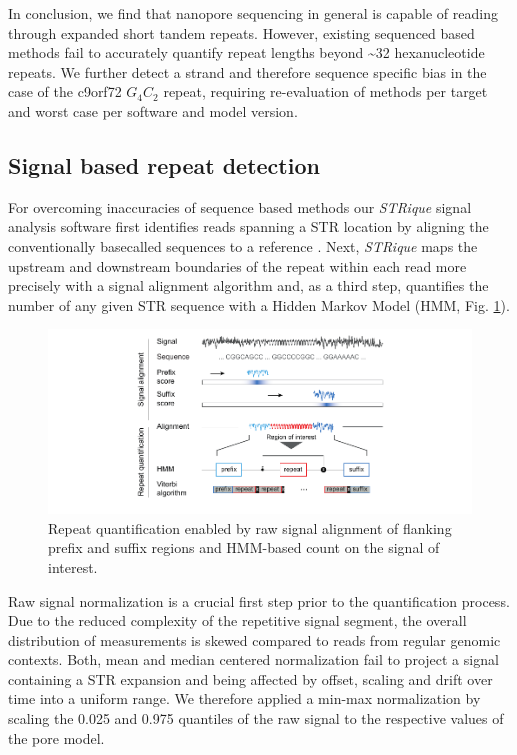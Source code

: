 In conclusion, we find that nanopore sequencing in general is capable of reading through expanded short tandem repeats. However, existing sequenced based methods fail to accurately quantify repeat lengths beyond \textasciitilde32 hexanucleotide repeats. We further detect a strand and therefore sequence specific bias in the case of the c9orf72 $ G_{4}C_{2} $ repeat, requiring re-evaluation of methods per target and worst case per software and model version.




\subsection{Signal based repeat detection}
\label{subsec:strique:sig_repeat_counts}

For overcoming inaccuracies of sequence based methods our \textit{STRique} signal analysis software first identifies reads spanning a STR location by aligning the conventionally basecalled sequences to a reference \cite{Li2018}. Next, \textit{STRique} maps the upstream and downstream boundaries of the repeat within each read more precisely with a signal alignment algorithm and, as a third step, quantifies the number of any given STR sequence with a Hidden Markov Model (HMM, Fig. \ref{fig:strique:count_structure_plasmid}). 

\begin{figure}[h]
	\centering
	\includegraphics[width=1.0\textwidth]{figures/strique/count_structure_plasmid.pdf}
	\captionsetup{format=plain}
	\caption[\textit{STRique}: generic repeat detection pipeline on raw nanopore signals]{Repeat quantification enabled by raw signal alignment of flanking prefix and suffix regions and HMM-based count on the signal of interest.}
	\label{fig:strique:count_structure_plasmid}
\end{figure}

Raw signal normalization is a crucial first step prior to the quantification process. Due to the reduced complexity of the repetitive signal segment, the overall distribution of measurements is skewed compared to reads from regular genomic contexts. Both, mean and median centered normalization fail to project a signal containing a STR expansion and being affected by offset, scaling and drift over time into a uniform range. 
We therefore applied a min-max normalization by scaling the 0.025 and 0.975 quantiles of the raw signal to the respective values of the pore model.

